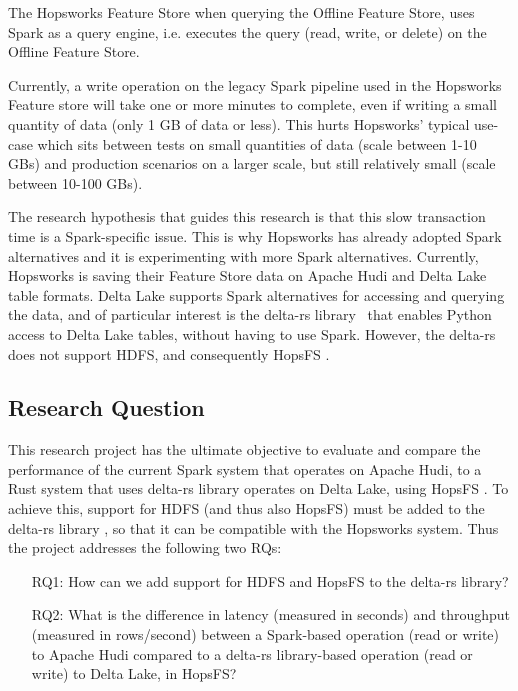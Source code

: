 The Hopsworks Feature Store \cite{HopsworksBatchRealtime2024} when querying the Offline Feature Store, uses Spark as a query engine, i.e. executes the query (read, write, or delete) on the Offline Feature Store.

Currently, a write operation on the legacy Spark pipeline used in the Hopsworks Feature store will take one or more minutes to complete, even if writing a small quantity of data (only 1 GB of data or less).
This hurts Hopsworks' typical use-case which sits between tests on small quantities of data (scale between 1-10 GBs) and production scenarios on a larger scale, but still relatively small (scale between 10-100 GBs).

The research hypothesis that guides this research is that this slow transaction time is a Spark-specific issue. This is why Hopsworks has already adopted Spark alternatives \cite{Khazanchi1801362} and it is experimenting with more Spark alternatives. Currently, Hopsworks is saving their Feature Store data on Apache Hudi and Delta Lake table formats. Delta Lake supports Spark alternatives for accessing and querying the data, and of particular interest is the delta-rs library~\cite{DeltaioDeltars2024} that enables Python access to Delta Lake tables, without having to use Spark. 
However, the delta-rs \cite{DeltaioDeltars2024} does not support \gls{HDFS}, and consequently \gls{HopsFS} \cite{niaziHopsFSScalingHierarchical2017}.

\subsection{Research Question}
\label{sec:researchQuestion}
This research project has the ultimate objective to evaluate and compare the performance of the current Spark system that operates on Apache Hudi, to a Rust system that uses delta-rs library \cite{DeltaioDeltars2024} operates on Delta Lake, using \gls{HopsFS} \cite{niaziHopsFSScalingHierarchical2017}. To achieve this, support for \gls{HDFS} (and thus also \gls{HopsFS}) must be added to the delta-rs library \cite{DeltaioDeltars2024}, so that it can be compatible with the Hopsworks system. Thus the project addresses the following two \glspl{RQ}:
\begin{enumerate}
    \item[RQ1:] How can we add support for \gls{HDFS} and \gls{HopsFS} to the delta-rs library?
    \item[RQ2:] What is the difference in latency (measured in seconds) and throughput (measured in rows/second) between a Spark-based operation (read or write) to Apache Hudi compared to a delta-rs library-based operation (read or write) to Delta Lake, in \gls{HopsFS}?  
\end{enumerate}

